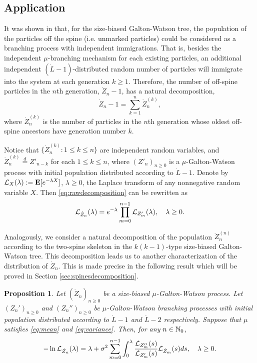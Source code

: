 \documentclass[12pt]{amsart}
\newtheorem{prop}[thm]{Proposition}
\numberwithin{equation}{section}
\newcommand{\eqlaw}{\overset{d}{=}}
\newcommand{\bE}{\mathbf E}\newcommand{\bbE}{\mathbb E}\newcommand{\cE}{\mathcal E}
\begin{document}
\subsection{Application}
	It was shown in \cite{lyons1995conceptual} that, for the size-biased Galton-Watson tree, the population of the particles off the spine (i.e. unmarked particles) could be considered as a branching process with independent immigrations. 
	That is, besides the independent $\mu$-branching mechanism for each existing particles, an additional independent $(\dot L-1)$-distributed random number of particles will immigrate into the system at each generation 
	$k\ge 1$. 
	Therefore, the number of off-spine particles in the $n$th generation, $\dot Z_n-1$, has a natural decomposition,
\begin{equation}
\label{eq:rawdecomposition}
		\dot Z_n-1
	=
		\sum_{k=1}^{n}\dot Z_n^{(k)},
\end{equation}
	where $\dot Z^{(k)}_n$ is the number of particles in the $n$th generation whose oldest off-spine ancestors have generation number $k$.
\par	
	Notice that 
	$\{\dot Z_n^{(k)}: 1\le k\le n\}$ are independent random variables, and $\dot Z_n^{(k)}\eqlaw Z'_{n-k}$ for each 
	$1\le k\le n$, where $(Z'_n)_{n\ge 0}$ is a $\mu$-Galton-Watson process with initial population distributed according to $\dot L-1$. 
	Denote by $\cL_X(\lambda):=\bE[e^{-\lambda X}]$, $\lambda \geq 0$, the Laplace  transform of 
	any nonnegative random variable $X$. 
	Then \eqref{eq:rawdecomposition} can be rewritten as
\begin{equation}
\label{eq:spinedecomposition}
		\mathcal L_{\dot Z_n}(\lambda)
	=
		e^{-\lambda}\prod_{m=0}^{n-1} \mathcal L_{Z'_m}(\lambda),
	\quad 
		\lambda \geq 0.
\end{equation}
\par
	Analogously, we consider a natural decomposition of the population $\ddot Z_n^{(n)}$ according to the two-spine skeleton in the $k(k-1)$-type size-biased Galton-Watson tree. This decomposition leads us to 
	another
	characterization of the distribution of $\dot Z_n$. This is made precise in the following result which will be proved in Section \ref{sec:spinesdecomposition}.
\begin{prop}
\label{lem:twospinedecomposition}
	Let $(\dot Z_n)_{n\ge 0}$ be a size-biased $\mu$-Galton-Watson process. 
	Let $(Z_n')_{n\ge 0}$ and $(Z_n'')_{n\ge 0}$ be $\mu$-Galton-Watson branching processes with initial population distributed according to $\dot L-1$ and $\ddot L-2$ respectively. 
	Suppose that $\mu$ satisfies \eqref{eq:mean} and \eqref{eq:variance}. 
	Then, for any $n\in \mathbb N_0$,
\begin{equation}
\label{eq:twospinedecomposition}
		-\ln \mathcal L_{\dot Z_n}(\lambda)
	=
		\lambda+\sigma^2\sum_{m=0}^{n-1}\int_0^\lambda \frac{\mathcal L_{Z''_m}(s)}{\mathcal L_{Z'_m}(s)}\mathcal L_{\dot Z_m}(s)ds,
	\quad
		\lambda \geq 0.
\end{equation}
\end{prop}
\end{document}
